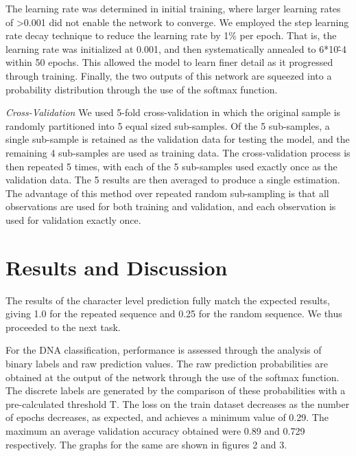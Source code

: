 \documentclass[conference]{IEEEtran}
\begin{document}
The learning rate was determined in initial training, where larger learning rates of >0.001 did not enable the network to converge. We employed the step learning rate decay technique to reduce the learning rate by 1\% per epoch. That is, the learning rate was initialized at 0.001, and then systematically annealed to 6*10\^-4 within 50 epochs. This allowed the model to
learn finer detail as it progressed through training. Finally, the two outputs of this network are squeezed into a probability distribution through the use of the softmax function.
\newline

\textit{Cross-Validation}\newline
We used 5-fold cross-validation in which the original sample is randomly partitioned into 5 equal sized sub-samples. Of the 5 sub-samples, a single sub-sample is retained as the validation data for testing the model, and the remaining 4 sub-samples are used as training data. The cross-validation process is then repeated 5 times, with each of the 5 sub-samples used exactly once as the validation data. The 5 results are then averaged to produce a single estimation. The advantage of this method over repeated random sub-sampling is that all observations are used for both training and validation, and each observation is used for validation exactly once.

\section{Results and Discussion}
The results of the character level prediction fully match the expected results, giving 1.0 for the repeated sequence and 0.25 for the random sequence. We thus proceeded to the next task.
\newline

For the DNA classification, performance is assessed through the analysis of binary labels and raw prediction values. The raw prediction probabilities are obtained at the output of the network through the use of the softmax function. The discrete labels are generated by the comparison of these probabilities with a pre-calculated threshold T. The loss on the train dataset decreases as the number of epochs decreases, as expected, and achieves a minimum value of 0.29. The maximum an average validation accuracy obtained were 0.89 and 0.729 respectively.
The graphs for the same are shown in figures 2 and 3.
\newline
\end{document}
